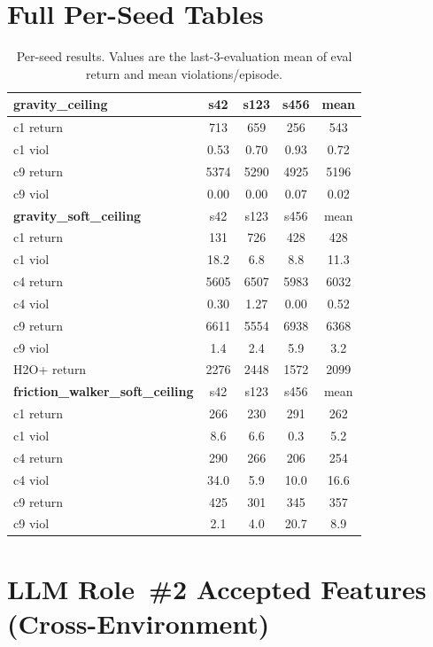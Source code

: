 \documentclass{article}
\theoremstyle{definition}
\begin{document}
\section{Full Per-Seed Tables}
\label{app:seeds}

\begin{table}[h]
\caption{Per-seed results.  Values are the last-3-evaluation mean of
eval return and mean violations/episode.}
\centering
\small
\begin{tabular}{l|ccc|c}
\toprule
\textbf{gravity\_ceiling} & s42 & s123 & s456 & mean \\
\midrule
c1 return     & 713  & 659  & 256  & 543 \\
c1 viol       & 0.53 & 0.70 & 0.93 & 0.72 \\
c9 return     & 5374 & 5290 & 4925 & 5196 \\
c9 viol       & 0.00 & 0.00 & 0.07 & 0.02 \\
\midrule
\textbf{gravity\_soft\_ceiling} & s42 & s123 & s456 & mean \\
\midrule
c1 return     & 131  & 726  & 428  & 428 \\
c1 viol       & 18.2 & 6.8  & 8.8  & 11.3 \\
c4 return     & 5605 & 6507 & 5983 & 6032 \\
c4 viol       & 0.30 & 1.27 & 0.00 & 0.52 \\
c9 return     & 6611 & 5554 & 6938 & 6368 \\
c9 viol       & 1.4  & 2.4  & 5.9  & 3.2 \\
H2O+ return   & 2276 & 2448 & 1572 & 2099 \\
\midrule
\textbf{friction\_walker\_soft\_ceiling} & s42 & s123 & s456 & mean \\
\midrule
c1 return     & 266  & 230  & 291  & 262 \\
c1 viol       & 8.6  & 6.6  & 0.3  & 5.2 \\
c4 return     & 290  & 266  & 206  & 254 \\
c4 viol       & 34.0 & 5.9  & 10.0 & 16.6 \\
c9 return     & 425  & 301  & 345  & 357 \\
c9 viol       & 2.1  & 4.0  & 20.7 & 8.9 \\
\bottomrule
\end{tabular}
\end{table}


\section{LLM Role~\#2 Accepted Features (Cross-Environment)}
\label{app:role2-features}
\end{document}
